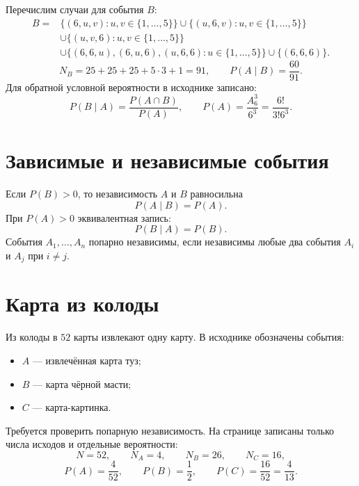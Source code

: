 Перечислим случаи для события $B$:
\begin{align*}
 B={}&\{(6,u,v):u,v\in\{1,\ldots,5\}\}
 \cup\{(u,6,v):u,v\in\{1,\ldots,5\}\}\\
 &\cup\{(u,v,6):u,v\in\{1,\ldots,5\}\}\\
 &\cup\{(6,6,u),(6,u,6),(u,6,6):u\in\{1,\ldots,5\}\}
 \cup\{(6,6,6)\}.
\end{align*}
\[
 N_B=25+25+25+5\cdot3+1=91,\qquad
 \boxed{P(A\mid B)=\frac{60}{91}.}
\]
Для обратной условной вероятности в исходнике записано:
\[
 P(B\mid A)=\frac{P(A\cap B)}{P(A)},\qquad
 P(A)=\frac{A_6^3}{6^3}=\frac{6!}{3!6^3}.
\]

\section*{Зависимые и независимые события}
Если $P(B)>0$, то независимость $A$ и $B$ равносильна
\[
 P(A\mid B)=P(A).
\]
При $P(A)>0$ эквивалентная запись:
\[
 P(B\mid A)=P(B).
\]
События $A_1,\ldots,A_n$ попарно независимы, если независимы любые
два события $A_i$ и $A_j$ при $i\ne j$.

\section*{Карта из колоды}
Из колоды в $52$ карты извлекают одну карту. В исходнике обозначены события:
\begin{itemize}
 \item $A$ --- извлечённая карта туз;
 \item $B$ --- карта чёрной масти;
 \item $C$ --- карта-картинка.
\end{itemize}
Требуется проверить попарную независимость. На странице записаны только
числа исходов и отдельные вероятности:
\[
 N=52,\qquad N_A=4,\qquad N_B=26,\qquad N_C=16,
\]
\[
 P(A)=\frac4{52},\qquad P(B)=\frac12,\qquad P(C)=\frac{16}{52}=\frac4{13}.
\]

